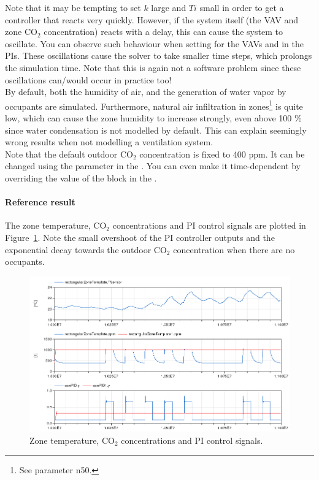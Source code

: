 \documentclass[10pt,a4paper]{article}
\begin{document}
Note that it may be tempting to set $k$ large and $Ti$ small
in order to get a controller that reacts very quickly. However,
if the system itself (the VAV and zone CO$_2$ concentration)
reacts with a delay, this can cause the system to oscillate.
You  can observe such behaviour when setting  for the VAVs and
 in the PIs.
These oscillations cause the solver to take smaller time steps, 
which prolongs the simulation time.
Note that this is again not a software problem since these oscillations can/would occur 
in practice too!\\


By default, both the humidity of air, and the generation of water
vapor by occupants are simulated.
Furthermore, natural air infiltration in zones\footnote{See parameter n50.} is quite low, 
which can cause the zone humidity to increase strongly, 
even above 100 \% since water condensation
is not modelled by default.
This can explain seemingly wrong results when not modelling
a ventilation system.\\

Note that the default outdoor CO$_2$ concentration is fixed to 400 ppm.
It can be changed using the parameter  in the 
. You can even make it time-dependent
by overriding the value of the  block 
in the .

\paragraph{Reference result}
The zone temperature, CO$_2$ concentrations and 
PI control signals are plotted in Figure~\ref{fig:res4}.
Note the small overshoot of the PI controller outputs
and the exponential decay towards the outdoor CO$_2$
concentration when there are no occupants.


\begin{figure}
\centering
\includegraphics[scale=0.7]{Example9.png}
\caption{Zone temperature, CO$_2$ concentrations and PI control signals.}
\label{fig:res4}
\end{figure}
\end{document}
